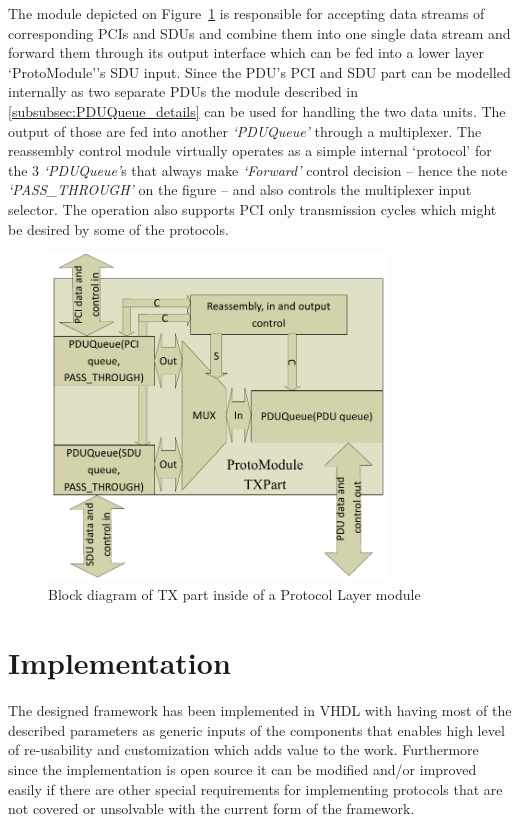 \documentclass[conference]{IEEEtran}
\begin{document}
The module depicted on Figure~\ref{fig:proto_layer_tx_sch} is responsible for accepting data streams of corresponding PCIs and SDUs and combine them into one single data stream and forward them through its output interface which can be fed into a lower layer `ProtoModule''s SDU input. Since the PDU's PCI and SDU part can be modelled internally as two separate PDUs the module described in \ref{subsubsec:PDUQueue_details} can be used for handling the two data units. The output of those are fed into another \emph{`PDUQueue'} through a multiplexer. The reassembly control module virtually operates as a simple internal `protocol' for the 3 \emph{`PDUQueue'}s that always make \emph{`Forward'} control decision -- hence the note \emph{`PASS\_THROUGH'} on the figure -- and also controls the multiplexer input selector. The operation also supports PCI only transmission cycles which might be desired by some of the protocols.
\begin{figure}[!htb]
    \centering
    \includegraphics[width=9cm]{figures_raw/proto_tx_part_imp.pdf}
    \caption{Block diagram of TX part inside of a Protocol Layer module}
    \label{fig:proto_layer_tx_sch}
\end{figure}

\section{Implementation}\label{sec:Implementation}

The designed framework has been implemented in VHDL with having most of the described parameters as generic inputs of the components that enables high level of re-usability and customization which adds value to the work. Furthermore since the implementation is open source it can be modified and/or improved easily if there are other special requirements for implementing protocols that are not covered or unsolvable with the current form of the framework. 
\end{document}
